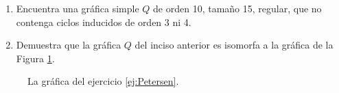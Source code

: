 \label{ej:Petersen} \begin{enumerate}
    \item Encuentra una gráfica simple $Q$ de orden 10, tamaño 15, regular, que no
    contenga ciclos inducidos de orden 3 ni 4.
    \item Demuestra que la gráfica $Q$ del inciso anterior es isomorfa a la
    gráfica de la Figura \ref{fig:Petersen}.
  \end{enumerate}
  \begin{figure}[!hbt]
	\begin{center}
	\end{center}
	\caption{La gráfica del ejercicio \ref{ej:Petersen}.}
	\label{fig:Petersen}
\end{figure}
  